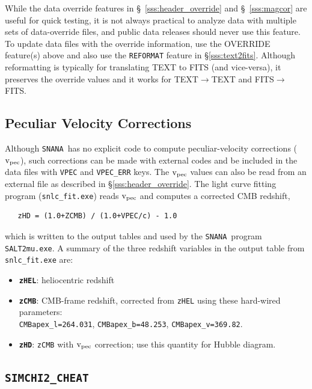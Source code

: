 \documentclass[12pt]{article}
\newcommand{\snana}{{\tt SNANA}}
\newcommand{\vpec}{{\rm v}_{\rm pec}}
\begin{document}
While the data override features in 
\S~\ref{sss:header_override} and \S~\ref{sss:magcor}
are useful for quick testing, it is not always practical to 
analyze data with multiple sets of data-override files,
and public data releases should never use this feature.
To update data files with the override information,
use the OVERRIDE feature(s) above and also
use the {\tt REFORMAT} feature in \S\ref{sss:text2fits}.
Although reformatting is typically for translating TEXT to FITS
(and vice-versa), it preserves the override values and
it works for TEXT$\to$TEXT and FITS$\to$FITS. 

\subsection{Peculiar Velocity Corrections }
\label{subsec:vpec}

Although \snana\ has no explicit code to compute
peculiar-velocity corrections ($\vpec$), such corrections
can be made with external codes and be included in the data files
with {\tt VPEC} and {\tt VPEC\_ERR} keys. The $\vpec$ values
can also be read from an external file as described in 
\S\ref{sss:header_override}. The light curve fitting program
({\tt snlc\_fit.exe}) reads $\vpec$ and computes a corrected
CMB redshift,
\begin{verbatim}
   zHD = (1.0+ZCMB) / (1.0+VPEC/c) - 1.0 
\end{verbatim}
which is written to the output tables and used by the \snana\ program
{\tt SALT2mu.exe}.
A summary of the three redshift variables in the output table
from {\tt snlc\_fit.exe}  are:
\begin{itemize}
   \itemsep0em 
   \item {\bf {\tt zHEL}}: heliocentric redshift
   \item {\bf {\tt zCMB}}: CMB-frame redshift, corrected from {\tt zHEL} using
       these hard-wired parameters: \\ {\tt CMBapex\_l=264.031}, {\tt CMBapex\_b=48.253}, {\tt CMBapex\_v=369.82}.
   \item {\bf {\tt zHD}}: {\tt zCMB} with $\vpec$ correction; use this quantity for Hubble diagram.
\end{itemize}


\subsection{{\tt SIMCHI2\_CHEAT} }
\label{subsec:simchi2_chear}
\end{document}
